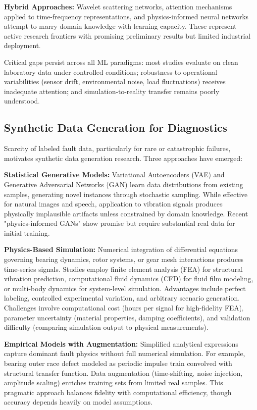 \documentclass[11pt,a4paper]{article}
\begin{document}
\textbf{Hybrid Approaches:} Wavelet scattering networks, attention mechanisms applied to time-frequency representations, and physics-informed neural networks attempt to marry domain knowledge with learning capacity. These represent active research frontiers with promising preliminary results but limited industrial deployment.

Critical gaps persist across all ML paradigms: most studies evaluate on clean laboratory data under controlled conditions; robustness to operational variabilities (sensor drift, environmental noise, load fluctuations) receives inadequate attention; and simulation-to-reality transfer remains poorly understood.

\subsection{Synthetic Data Generation for Diagnostics}

Scarcity of labeled fault data, particularly for rare or catastrophic failures, motivates synthetic data generation research. Three approaches have emerged:

\textbf{Statistical Generative Models:} Variational Autoencoders (VAE) and Generative Adversarial Networks (GAN) learn data distributions from existing samples, generating novel instances through stochastic sampling. While effective for natural images and speech, application to vibration signals produces physically implausible artifacts unless constrained by domain knowledge. Recent "physics-informed GANs" show promise but require substantial real data for initial training.

\textbf{Physics-Based Simulation:} Numerical integration of differential equations governing bearing dynamics, rotor systems, or gear mesh interactions produces time-series signals. Studies employ finite element analysis (FEA) for structural vibration prediction, computational fluid dynamics (CFD) for fluid film modeling, or multi-body dynamics for system-level simulation. Advantages include perfect labeling, controlled experimental variation, and arbitrary scenario generation. Challenges involve computational cost (hours per signal for high-fidelity FEA), parameter uncertainty (material properties, damping coefficients), and validation difficulty (comparing simulation output to physical measurements).

\textbf{Empirical Models with Augmentation:} Simplified analytical expressions capture dominant fault physics without full numerical simulation. For example, bearing outer race defect modeled as periodic impulse train convolved with structural transfer function. Data augmentation (time-shifting, noise injection, amplitude scaling) enriches training sets from limited real samples. This pragmatic approach balances fidelity with computational efficiency, though accuracy depends heavily on model assumptions.
\end{document}

